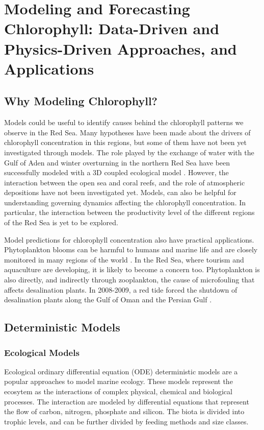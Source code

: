 \section{Modeling and Forecasting Chlorophyll: Data-Driven and Physics-Driven Approaches, and Applications}

\subsection{Why Modeling Chlorophyll?}

Models could be useful to identify causes behind the chlorophyll patterns we observe in the Red Sea. Many hypotheses have been made about the drivers of chlorophyll concentration in this regions, but some of them have not been yet investigated through models. The role played by the exchange of water with the Gulf of Aden and winter overturning in the northern Red Sea have been successfully modeled with a 3D coupled ecological model \citep{Triantafyllou2014}. However, the interaction between the open sea and coral reefs, and the role of atmospheric depositions have not been investigated yet. Models, can also be helpful for understanding governing dynamics affecting the chlorophyll concentration. In particular, the interaction between the productivity level of the different regions of the Red Sea is yet to be explored.

Model predictions for chlorophyll concentration also have practical applications. Phytoplankton blooms can be harmful to humans and marine life and are closely monitored in many regions of the world \citep{Pettersson2013}. In the Red Sea, where tourism and aquaculture are developing, it is likely to become a concern too. Phytoplankton is also directly, and indirectly through zooplankton, the cause of microfouling that affects desalination plants. In 2008-2009, a red tide forced the shutdown of desalination plants along the Gulf of Oman and the Persian Gulf \citep{Richlen2010}.


\subsection{Deterministic Models}

\subsubsection{Ecological Models}

Ecological ordinary differential equation (ODE) deterministic models are a popular approaches to model marine ecology. These models represent the ecosytem as the interactions of complex physical, chemical and biological processes. The interaction are modeled by differential equations that represent the flow of carbon, nitrogen, phosphate and silicon. The biota is divided into trophic levels, and can be further divided by feeding methods and size classes.

